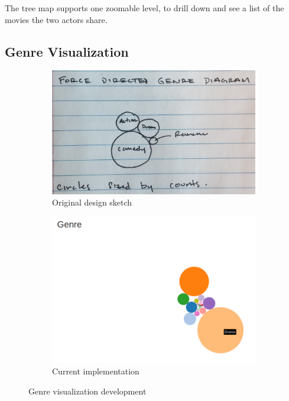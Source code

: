 \documentclass[12pt]{article}
\begin{document}
The tree map supports one zoomable level, to drill down and see a list of the movies the two actors share.
\newpage

\subsection{Genre Visualization}

	\begin{figure}[h!]
		\centering
		\begin{subfigure}[t]{.5\textwidth}
		  \centering
		  \includegraphics[width=\linewidth]{images/genreVis_crop.png}
		  \caption{Original design sketch}
		  \label{fig:sub1}
		\end{subfigure}%
		\begin{subfigure}[t]{.5\textwidth}
		  \centering
		  \includegraphics[width=.9\linewidth]{images/genreVis.png}
		  \caption{Current implementation}
		  \label{fig:sub2}
		\end{subfigure}%
		\caption{Genre visualization development}
		\label{fig:genreVis}
	\end{figure}
\end{document}

